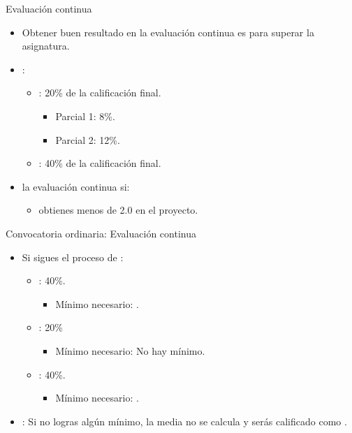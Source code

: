 \begin{frame}[t]{Evaluación continua}
\begin{itemize}
  \item Obtener buen resultado en la evaluación continua es  para superar 
        la asignatura.
  
  \item {}:
    \begin{itemize}
      \item {}: 20\% de la calificación final.
        \begin{itemize}
          \item Parcial 1: 8\%.
          \item Parcial 2: 12\%.
        \end{itemize}
      \item {}: 40\% de la calificación final.
    \end{itemize}
  
  \item {} la evaluación continua si:
    \begin{itemize}
      \item obtienes menos de 2.0 en el proyecto.
    \end{itemize}
\end{itemize}
\end{frame}

\begin{frame}[t]{Convocatoria ordinaria: Evaluación continua}
\begin{itemize}
  \item Si sigues el proceso de :
    \begin{itemize}
    \item {}: 40\%.
      \begin{itemize}
        \item Mínimo necesario: .
      \end{itemize}
    \item {}: 20\%
      \begin{itemize}
        \item Mínimo necesario: \alert{No hay mínimo}.
      \end{itemize}
    \item {}: 40\%.
      \begin{itemize}
        \item Mínimo necesario: .
      \end{itemize}
  \end{itemize}

  \item {}: Si no logras algún mínimo, 
        la media no se calcula y serás calificado como .
\end{itemize}
\end{frame}

